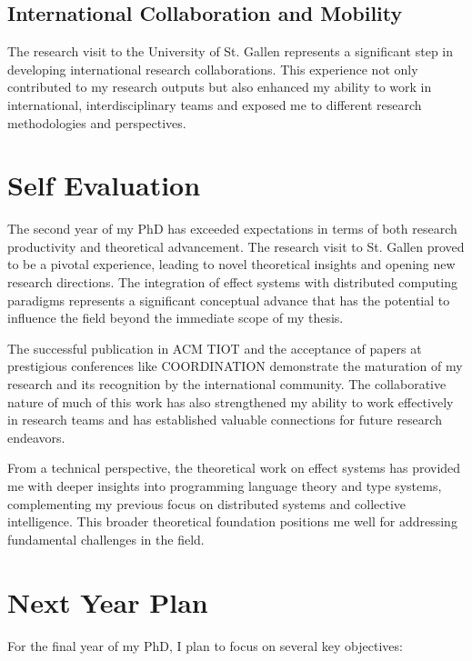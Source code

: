 \documentclass[runningheads]{llncs}
\begin{document}
\subsection{International Collaboration and Mobility}

The research visit to the University of St. Gallen represents a significant step in developing international research collaborations. This experience not only contributed to my research outputs but also enhanced my ability to work in international, interdisciplinary teams and exposed me to different research methodologies and perspectives.

\section{Self Evaluation}

The second year of my PhD has exceeded expectations in terms of both research productivity and theoretical advancement. The research visit to St. Gallen proved to be a pivotal experience, leading to novel theoretical insights and opening new research directions. The integration of effect systems with distributed computing paradigms represents a significant conceptual advance that has the potential to influence the field beyond the immediate scope of my thesis.

The successful publication in ACM TIOT and the acceptance of papers at prestigious conferences like COORDINATION demonstrate the maturation of my research and its recognition by the international community. The collaborative nature of much of this work has also strengthened my ability to work effectively in research teams and has established valuable connections for future research endeavors.

From a technical perspective, the theoretical work on effect systems has provided me with deeper insights into programming language theory and type systems, complementing my previous focus on distributed systems and collective intelligence. This broader theoretical foundation positions me well for addressing fundamental challenges in the field.

\section{Next Year Plan}

For the final year of my PhD, I plan to focus on several key objectives:
\end{document}
